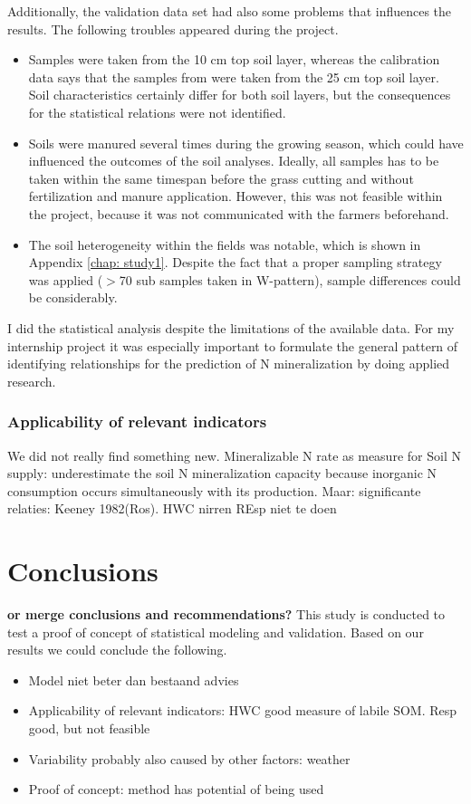 \documentclass[10pt,twoside,dutch,english]{report}
\begin{document}
   Additionally, the validation data set had also some problems that influences the results. The following troubles appeared during the project.
		   \begin{itemize}
	\item Samples were taken from the 10 cm top soil layer, whereas the calibration data says that the samples from \citet{Echeverri2014} were taken from the 25 cm top soil layer. Soil characteristics certainly differ for both soil layers, but the consequences for the statistical relations were not identified. 
   	\item Soils were manured several times during the growing season, which could have influenced the outcomes of the soil analyses. Ideally, all samples has to be taken within the same timespan before the grass cutting and without fertilization and manure application. However, this was not feasible within the project, because it was not communicated with the farmers beforehand.
   	\item The soil heterogeneity within the fields was notable, which is shown in Appendix \ref{chap: study1}. Despite the fact that a proper sampling strategy was applied ($>$70 sub samples taken in W-pattern), sample differences could be considerably. 
   \end{itemize}
   
   I did the statistical analysis despite the limitations of the available data. For my internship project it was especially important to formulate the general pattern of identifying relationships for the prediction of N mineralization by doing applied research. 
   
	\subsection{Applicability of relevant indicators}
    We did not really find something new. 
    Mineralizable N rate as measure for Soil N supply: underestimate the soil N mineralization capacity because inorganic N consumption occurs simultaneously with its production. Maar: significante relaties: Keeney 1982(Ros). 
    HWC nirren
    REsp niet te doen

\chapter{Conclusions }
\textbf{or merge conclusions and recommendations?}
This study is conducted to test a proof of concept of statistical modeling and validation. Based on our results we could conclude the following. 
\begin{itemize}
\item Model niet beter dan bestaand advies
\item Applicability of relevant indicators: HWC good measure of labile SOM. Resp good, but not feasible
\item Variability probably also caused by other factors: weather
\item Proof of concept: method has potential of being used
\end{itemize}
\end{document}
